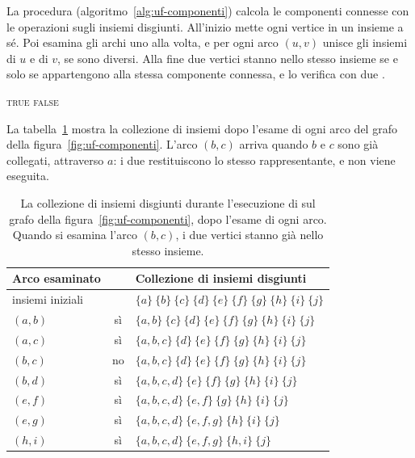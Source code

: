 La procedura \ConnectedComponents{} (algoritmo~\ref{alg:uf-componenti}) calcola le componenti connesse con le operazioni sugli insiemi disgiunti. All'inizio mette ogni vertice in un insieme a sé. Poi esamina gli archi uno alla volta, e per ogni arco $(u,v)$ unisce gli insiemi di $u$ e di $v$, se sono diversi. Alla fine due vertici stanno nello stesso insieme se e solo se appartengono alla stessa componente connessa, e \SameComponent{} lo verifica con due \FindSet{}.

\begin{algorithm}[htbp]
\caption{Il calcolo delle componenti connesse di un grafo $G$ con le operazioni sugli insiemi disgiunti, e la verifica che due vertici stiano nella stessa componente.}\label{alg:uf-componenti}
\begin{algorithmic}[1]
    \State {}
  \EndFor
      \State {}
    \EndIf
  \EndFor
\EndProcedure
\Statex
{}
    \State \Return \textsc{true}
  \Else
    \State \Return \textsc{false}
  \EndIf
\EndProcedure
\end{algorithmic}
\end{algorithm}

La tabella~\ref{tab:uf-componenti} mostra la collezione di insiemi dopo l'esame di ogni arco del grafo della figura~\ref{fig:uf-componenti}. L'arco $(b,c)$ arriva quando $b$ e $c$ sono già collegati, attraverso $a$: i due \FindSet{} restituiscono lo stesso rappresentante, e \Union{} non viene eseguita.

\begin{table}[htbp]
\centering
\small
\begin{tabular}{lcl}
\toprule
Arco esaminato & \Union{} & Collezione di insiemi disgiunti \\
\midrule
insiemi iniziali & & $\{a\}\ \{b\}\ \{c\}\ \{d\}\ \{e\}\ \{f\}\ \{g\}\ \{h\}\ \{i\}\ \{j\}$ \\
$(a,b)$ & sì & $\{a,b\}\ \{c\}\ \{d\}\ \{e\}\ \{f\}\ \{g\}\ \{h\}\ \{i\}\ \{j\}$ \\
$(a,c)$ & sì & $\{a,b,c\}\ \{d\}\ \{e\}\ \{f\}\ \{g\}\ \{h\}\ \{i\}\ \{j\}$ \\
$(b,c)$ & no & $\{a,b,c\}\ \{d\}\ \{e\}\ \{f\}\ \{g\}\ \{h\}\ \{i\}\ \{j\}$ \\
$(b,d)$ & sì & $\{a,b,c,d\}\ \{e\}\ \{f\}\ \{g\}\ \{h\}\ \{i\}\ \{j\}$ \\
$(e,f)$ & sì & $\{a,b,c,d\}\ \{e,f\}\ \{g\}\ \{h\}\ \{i\}\ \{j\}$ \\
$(e,g)$ & sì & $\{a,b,c,d\}\ \{e,f,g\}\ \{h\}\ \{i\}\ \{j\}$ \\
$(h,i)$ & sì & $\{a,b,c,d\}\ \{e,f,g\}\ \{h,i\}\ \{j\}$ \\
\bottomrule
\end{tabular}
\caption{La collezione di insiemi disgiunti durante l'esecuzione di \ConnectedComponents{} sul grafo della figura~\ref{fig:uf-componenti}, dopo l'esame di ogni arco. Quando si esamina l'arco $(b,c)$, i due vertici stanno già nello stesso insieme.}
\label{tab:uf-componenti}
\end{table}

